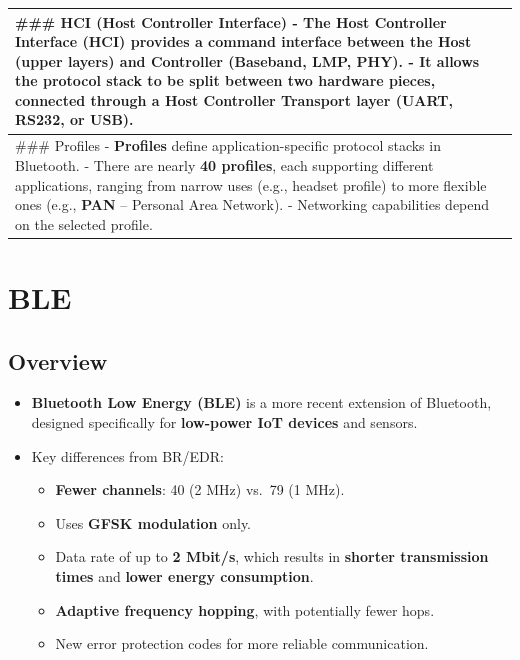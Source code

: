 \documentclass[a4paper, 12pt]{book} %
\begin{document}
\begin{longtable}[]{@{}
  >{\raggedright\arraybackslash}p{}@{}}
\toprule\noalign{}
\begin{minipage}[b]{\linewidth}\raggedright
\#\#\# HCI (Host Controller Interface) - The \textbf{Host Controller
Interface (HCI)} provides a command interface between the \textbf{Host}
(upper layers) and \textbf{Controller} (Baseband, LMP, PHY). - It allows
the protocol stack to be split between two hardware pieces, connected
through a \textbf{Host Controller Transport} layer (UART, RS232, or
USB).
\end{minipage} \\
\midrule\noalign{}
\endhead
\bottomrule\noalign{}
\endlastfoot
\#\#\# Profiles - \textbf{Profiles} define application-specific protocol
stacks in Bluetooth. - There are nearly \textbf{40 profiles}, each
supporting different applications, ranging from narrow uses (e.g.,
headset profile) to more flexible ones (e.g., \textbf{PAN} -- Personal
Area Network). - Networking capabilities depend on the selected
profile. \\
\end{longtable}

\section{BLE}\label{ble}

\subsection{Overview}\label{overview-1}

\begin{itemize}
\tightlist
\item
  \textbf{Bluetooth Low Energy (BLE)} is a more recent extension of
  Bluetooth, designed specifically for \textbf{low-power IoT devices}
  and sensors.\\
\item
  Key differences from BR/EDR:

  \begin{itemize}
  \tightlist
  \item
    \textbf{Fewer channels}: 40 (2 MHz) vs.~79 (1 MHz).
  \item
    Uses \textbf{GFSK modulation} only.\\
  \item
    Data rate of up to \textbf{2 Mbit/s}, which results in
    \textbf{shorter transmission times} and \textbf{lower energy
    consumption}.\\
  \item
    \textbf{Adaptive frequency hopping}, with potentially fewer hops.\\
  \item
    New error protection codes for more reliable communication.
  \end{itemize}
\end{itemize}
\end{document}
